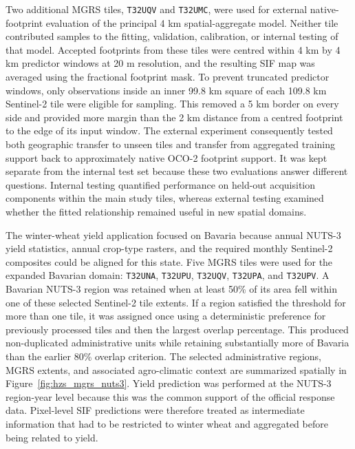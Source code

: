 Two additional MGRS tiles, \texttt{T32UQV} and \texttt{T32UMC}, were used for external native-footprint evaluation of the principal 4 km spatial-aggregate model. Neither tile contributed samples to the fitting, validation, calibration, or internal testing of that model. Accepted footprints from these tiles were centred within 4 km by 4 km predictor windows at 20 m resolution, and the resulting SIF map was averaged using the fractional footprint mask. To prevent truncated predictor windows, only observations inside an inner 99.8 km square of each 109.8 km Sentinel-2 tile were eligible for sampling. This removed a 5 km border on every side and provided more margin than the 2 km distance from a centred footprint to the edge of its input window. The external experiment consequently tested both geographic transfer to unseen tiles and transfer from aggregated training support back to approximately native OCO-2 footprint support. It was kept separate from the internal test set because these two evaluations answer different questions. Internal testing quantified performance on held-out acquisition components within the main study tiles, whereas external testing examined whether the fitted relationship remained useful in new spatial domains.

The winter-wheat yield application focused on Bavaria because annual NUTS-3 yield statistics, annual crop-type rasters, and the required monthly Sentinel-2 composites could be aligned for this state. Five MGRS tiles were used for the expanded Bavarian domain: \texttt{T32UNA}, \texttt{T32UPU}, \texttt{T32UQV}, \texttt{T32UPA}, and \texttt{T32UPV}. A Bavarian NUTS-3 region was retained when at least 50\% of its area fell within one of these selected Sentinel-2 tile extents. If a region satisfied the threshold for more than one tile, it was assigned once using a deterministic preference for previously processed tiles and then the largest overlap percentage. This produced non-duplicated administrative units while retaining substantially more of Bavaria than the earlier 80\% overlap criterion. The selected administrative regions, MGRS extents, and associated agro-climatic context are summarized spatially in Figure~\ref{fig:hzs_mgrs_nuts3}. Yield prediction was performed at the NUTS-3 region-year level because this was the common support of the official response data. Pixel-level SIF predictions were therefore treated as intermediate information that had to be restricted to winter wheat and aggregated before being related to yield.

